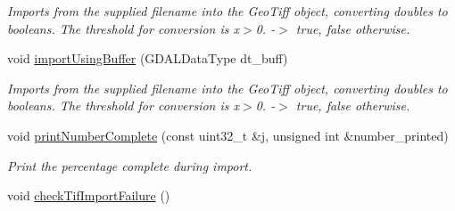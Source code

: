 \begin{DoxyCompactItemize}
\begin{DoxyCompactList}\small\item\em Imports from the supplied filename into the Geo\+Tiff object, converting doubles to booleans. The threshold for conversion is x$>$0. -\/$>$ true, false otherwise. \end{DoxyCompactList}\item 
void \hyperlink{class_map_ae88574927ad3a38fc0a9bc253a9e4a7a}{import\+Using\+Buffer} (G\+D\+A\+L\+Data\+Type dt\+\_\+buff)
\begin{DoxyCompactList}\small\item\em Imports from the supplied filename into the Geo\+Tiff object, converting doubles to booleans. The threshold for conversion is x$>$0. -\/$>$ true, false otherwise. \end{DoxyCompactList}\item 
void \hyperlink{class_map_a03e0486e704090765d253b18a9dde0f5}{print\+Number\+Complete} (const uint32\+\_\+t \&j, unsigned int \&number\+\_\+printed)
\begin{DoxyCompactList}\small\item\em Print the percentage complete during import. \end{DoxyCompactList}\item 
void \hyperlink{class_map_a6387185da6dc3063cd2311ffab0a5fba}{check\+Tif\+Import\+Failure} ()\hypertarget{class_map_a6387185da6dc3063cd2311ffab0a5fba}{}\label{class_map_a6387185da6dc3063cd2311ffab0a5fba}


\end{DoxyCompactItemize}
